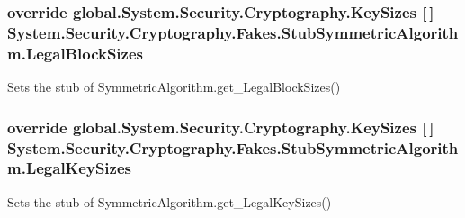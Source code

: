 \hypertarget{class_system_1_1_security_1_1_cryptography_1_1_fakes_1_1_stub_symmetric_algorithm_aa55e0370977534ded3edac63ef03095e}{
\subsubsection[{Legal\-Block\-Sizes}]{\setlength{\rightskip}{0pt plus 5cm}override global.\-System.\-Security.\-Cryptography.\-Key\-Sizes \mbox{[}$\,$\mbox{]} System.\-Security.\-Cryptography.\-Fakes.\-Stub\-Symmetric\-Algorithm.\-Legal\-Block\-Sizes\hspace{0.3cm}{\ttfamily [get]}}}\label{class_system_1_1_security_1_1_cryptography_1_1_fakes_1_1_stub_symmetric_algorithm_aa55e0370977534ded3edac63ef03095e}


Sets the stub of Symmetric\-Algorithm.\-get\-\_\-\-Legal\-Block\-Sizes()

\hypertarget{class_system_1_1_security_1_1_cryptography_1_1_fakes_1_1_stub_symmetric_algorithm_a9da246dc8c278ddbfa2047007d29fc6f}{
\subsubsection[{Legal\-Key\-Sizes}]{\setlength{\rightskip}{0pt plus 5cm}override global.\-System.\-Security.\-Cryptography.\-Key\-Sizes \mbox{[}$\,$\mbox{]} System.\-Security.\-Cryptography.\-Fakes.\-Stub\-Symmetric\-Algorithm.\-Legal\-Key\-Sizes\hspace{0.3cm}{\ttfamily [get]}}}\label{class_system_1_1_security_1_1_cryptography_1_1_fakes_1_1_stub_symmetric_algorithm_a9da246dc8c278ddbfa2047007d29fc6f}


Sets the stub of Symmetric\-Algorithm.\-get\-\_\-\-Legal\-Key\-Sizes()

